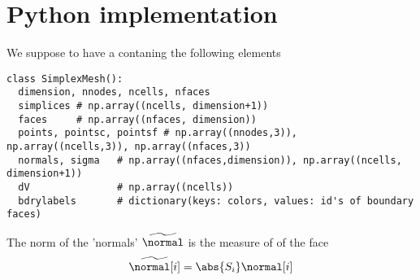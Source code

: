 %
\section{Python implementation}\label{sec:}
%
We suppose to have a   contaning the following elements
\begin{lstlisting}
class SimplexMesh():
  dimension, nnodes, ncells, nfaces
  simplices # np.array((ncells, dimension+1))
  faces     # np.array((nfaces, dimension))
  points, pointsc, pointsf # np.array((nnodes,3)), np.array((ncells,3)), np.array((nfaces,3))
  normals, sigma   # np.array((nfaces,dimension)), np.array((ncells, dimension+1))
  dV               # np.array((ncells))
  bdrylabels       # dictionary(keys: colors, values: id's of boundary faces)
\end{lstlisting}
%
The norm of the 'normals' $\widetilde{\normal}$ is the measure of of the face
%
\begin{align*}
\widetilde{\normal[i]} = \abs{S_i} \normal[i]
\end{align*}
%
%
%
\printbibliography[title=References Section~\thesection]

